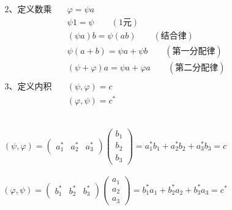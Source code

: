 \begin{frame} 
    \begin{equation*}
        \begin{split}
            \text{2、定义数乘} \quad &\varphi=\psi a\\
            &\psi 1= \psi \qquad (\text{1元})\\
            &(\psi a)b=\psi (ab) \qquad (\text{结合律})\\
            &\psi(a+b)= \psi a+ \psi b \qquad (\text{第一分配律})\\
            &(\psi+\varphi) a= \psi a +\varphi a \qquad (\text{第二分配律})\\
            ~~\\
        \text{3、定义内积} \quad &(\psi, \varphi)=c\\
        &(\varphi,\psi)=c^*
        \end{split} 
    \end{equation*}
\end{frame} 

\begin{frame} 

    \解 ~ \[(\psi, \varphi) = \begin{pmatrix}
        a_1 ^* &
        a_2 ^* &
        a_3 ^*
    \end{pmatrix}
        \begin{pmatrix}
        b_1\\
        b_2\\
        b_3
    \end{pmatrix}
    =a_1 ^* b_1 +a_2 ^* b_2 +a_3 ^* b_3
    =c 
    \]
    ~ \[(\varphi,\psi) = \begin{pmatrix}
        b_1 ^* &
        b_2 ^* &
        b_3 ^*
    \end{pmatrix}
        \begin{pmatrix}
        a_1\\
        a_2\\
        a_3
    \end{pmatrix}
    =b_1 ^* a_1 +b_2 ^* a_2 +b_3 ^* a_3
    =c^* 
    \]
\end{frame} 

